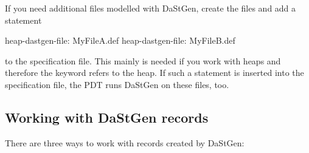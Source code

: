 If you need additional files modelled with DaStGen, create the files and add a
statement
\begin{code}
heap-dastgen-file: MyFileA.def
heap-dastgen-file: MyFileB.def
\end{code}
\noindent
to the specification file. This mainly is needed if you work with heaps and
therefore the keyword refers to the heap. 
If such a statement is inserted into the specification file, the PDT runs
DaStGen on these files, too.



\subsection{Working with DaStGen records}

There are three ways to work with records created by DaStGen:
